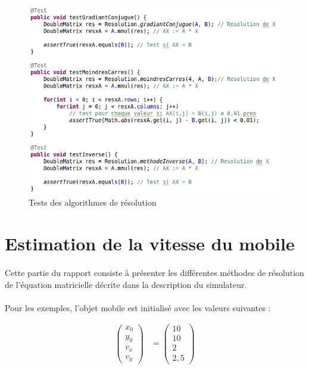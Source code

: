 \documentclass[a4paper,11pt]{article}
\begin{document}
		\begin{figure}[h]
			\centerline{\includegraphics[scale=0.50]{img/testResol.png}}
			\caption{Tests des algorithmes de résolution}
			\label{diagramme-composants}
		\end{figure} 



	\newpage

	\section{Estimation de la vitesse du mobile}
		
		\paragraph{}
		Cette partie du rapport consiste à présenter les différentes méthodes de résolution de l'équation matricielle décrite dans la description du simulateur.

		\paragraph{}
		Pour les exemples, l'objet mobile est initialisé avec les valeurs suivantes :

		\begin{align}
			\begin{pmatrix}
			    x_0 \\
			    y_0 \\
			    v_x \\
			    v_y  
			\end{pmatrix}
			&=
			\begin{pmatrix}
			    10 \\
			    10 \\
			    2 \\
			    2,5
			\end{pmatrix}
		\end{align}
\end{document}
